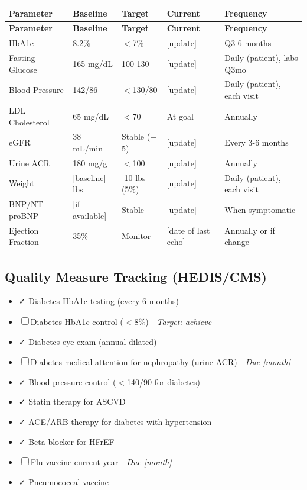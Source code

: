 \documentclass[11pt,letterpaper]{article}
\begin{document}
\begin{longtable}{|p{3.5cm}|p{2.5cm}|p{2cm}|p{2cm}|p{3cm}|}
\hline
\textbf{Parameter} & \textbf{Baseline} & \textbf{Target} & \textbf{Current} & \textbf{Frequency} \\ \hline
\endfirsthead
\hline
\textbf{Parameter} & \textbf{Baseline} & \textbf{Target} & \textbf{Current} & \textbf{Frequency} \\ \hline
\endhead
HbA1c & 8.2\% & $<$7\% & [update] & Q3-6 months \\ \hline
Fasting Glucose & 165 mg/dL & 100-130 & [update] & Daily (patient), labs Q3mo \\ \hline
Blood Pressure & 142/86 & $<$130/80 & [update] & Daily (patient), each visit \\ \hline
LDL Cholesterol & 65 mg/dL & $<$70 & At goal & Annually \\ \hline
eGFR & 38 mL/min & Stable ($\pm$5) & [update] & Every 3-6 months \\ \hline
Urine ACR & 180 mg/g & $<$100 & [update] & Annually \\ \hline
Weight & [baseline] lbs & -10 lbs (5\%) & [update] & Daily (patient), each visit \\ \hline
BNP/NT-proBNP & [if available] & Stable & [update] & When symptomatic \\ \hline
Ejection Fraction & 35\% & Monitor & [date of last echo] & Annually or if change \\ \hline
\end{longtable}

\subsection*{Quality Measure Tracking (HEDIS/CMS)}

\begin{itemize}[leftmargin=*]
    \item ✓ Diabetes HbA1c testing (every 6 months)
    \item ☐ Diabetes HbA1c control ($<$8\%) - \textit{Target: achieve}
    \item ✓ Diabetes eye exam (annual dilated)
    \item ☐ Diabetes medical attention for nephropathy (urine ACR) - \textit{Due [month]}
    \item ✓ Blood pressure control ($<$140/90 for diabetes)
    \item ✓ Statin therapy for ASCVD
    \item ✓ ACE/ARB therapy for diabetes with hypertension
    \item ✓ Beta-blocker for HFrEF
    \item ☐ Flu vaccine current year - \textit{Due [month]}
    \item ✓ Pneumococcal vaccine
\end{itemize}
\end{document}
